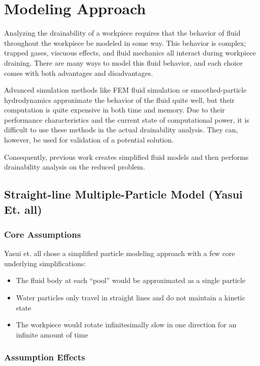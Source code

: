 						\chapter{Modeling Approach}

Analyzing the drainability of a workpiece requires that the behavior of fluid throughout the workpiece be modeled in some way. This behavior is complex; trapped gases, viscuous effects, and fluid mechanics all interact during workpiece draining. There are many ways to model this fluid behavior, and each choice comes with both advantages and disadvantages.

Advanced simulation methods like FEM fluid simulation or smoothed-particle hydrodynamics approximate the behavior of the fluid quite well, but their computation is quite expensive in both time and memory. Due to their performance characteristics and the current state of computational power, it is difficult to use these methods in the actual drainability analysis. They can, however, be used for validation of a potential solution.

Consequently, previous work creates simplified fluid models and then performs drainability analysis on the reduced problem.

\section{Straight-line Multiple-Particle Model (Yasui Et. all)}

	\subsection{Core Assumptions}

Yasui et. all chose a simplified particle modeling approach with a few core underlying simplifications:

\begin{itemize}
	\item The fluid body at each ``pool'' would be approximated as a single particle
	\item Water particles only travel in straight lines and do not maintain a kinetic state
	\item The workpiece would rotate infinitesimally slow in one direction for an infinite amount of time
\end{itemize}

	\subsection{Assumption Effects}

